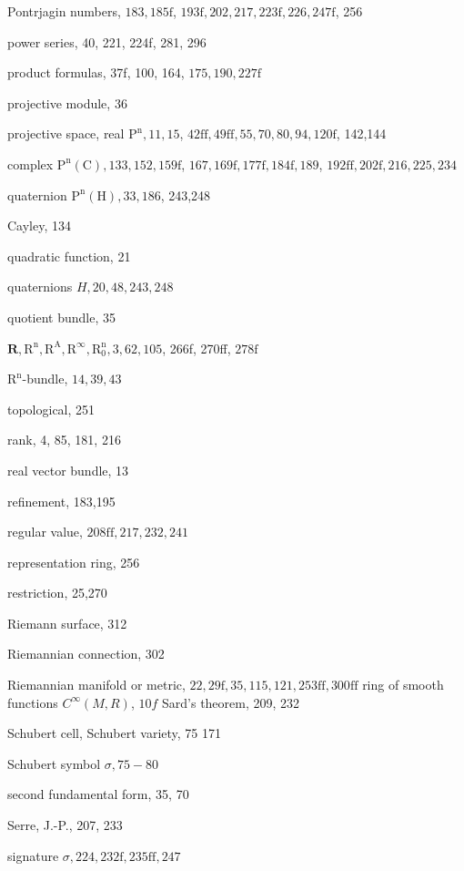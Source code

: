\documentclass[10pt]{article}
\begin{document}
Pontrjagin numbers, $183,185 \mathrm{f}$, $193 \mathrm{f}, 202,217,223 \mathrm{f}, 226,247 \mathrm{f}$, 256

power series, 40, 221, 224f, 281, 296

product formulas, 37f, 100, 164, $175,190,227 \mathrm{f}$

projective module, 36

projective space, real $\mathrm{P}^{\mathrm{n}}, 11,15$, $42 \mathrm{ff}, 49 \mathrm{ff}, 55,70,80,94,120 \mathrm{f}$, 142,144

complex $\mathrm{P}^{\mathrm{n}}(\mathrm{C}), 133,152,159 \mathrm{f}$, $167,169 \mathrm{f}, 177 \mathrm{f}, 184 \mathrm{f}, 189$, $192 \mathrm{ff}, 202 \mathrm{f}, 216,225,234$

quaternion $\mathrm{P}^{\mathrm{n}}(\mathrm{H}), 33,186$, 243,248

Cayley, 134

quadratic function, 21

quaternions $H, 20,48,243,248$

quotient bundle, 35

$\mathbf{R}, \mathrm{R}^{\mathrm{n}}, \mathrm{R}^{\mathrm{A}}, \mathrm{R}^{\infty}, \mathrm{R}_{0}^{\mathrm{n}}, 3,62,105$, 266f, 270ff, $278 \mathrm{f}$

$\mathrm{R}^{\mathrm{n}}$-bundle, $14,39,43$

topological, 251

rank, 4, 85, 181, 216

real vector bundle, 13

refinement, 183,195

regular value, $208 \mathrm{ff}, 217,232,241$

representation ring, 256

restriction, 25,270

Riemann surface, 312

Riemannian connection, 302

Riemannian manifold or metric, $22,29 \mathrm{f}, 35,115,121,253 \mathrm{ff}, 300 \mathrm{ff}$ ring of smooth functions $C^{\infty}(M, R)$, $10 f$ Sard's theorem, 209, 232

Schubert cell, Schubert variety, 75 171

Schubert symbol $\sigma, 75-80$

second fundamental form, 35, 70

Serre, J.-P., 207, 233

signature $\sigma, 224,232 \mathrm{f}, 235 \mathrm{ff}, 247$
\end{document}

